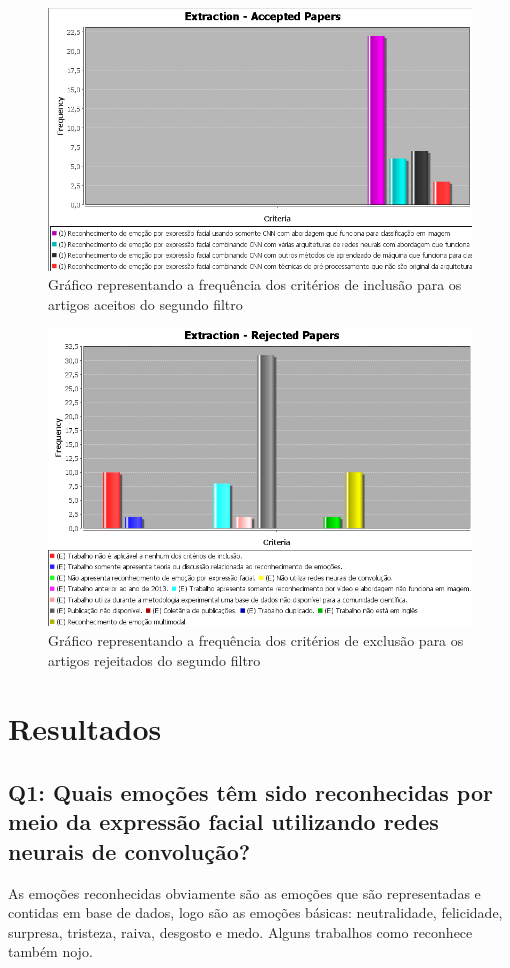 \begin{figure}
\centering
\includegraphics[scale=0.75]{figuras/paperscriteriaaccepted.png}
\caption{Gráfico representando a frequência dos critérios de inclusão para os artigos aceitos do segundo filtro}
\label{fig:papersbyyear}
\end{figure}

\begin{figure}
\centering
\includegraphics[scale=0.75]{figuras/paperscriteriarejected.png}
\caption{Gráfico representando a frequência dos critérios de exclusão para os artigos rejeitados do segundo filtro}
\label{fig:papersbyyear}
\end{figure}

\section{Resultados}\label{sec:results}
\subsection{Q1: Quais emoções têm sido reconhecidas por meio da expressão facial utilizando redes neurais de convolução?}
As emoções reconhecidas obviamente são as emoções que são representadas e contidas em base de dados, logo são as emoções básicas: neutralidade, felicidade, surpresa, tristeza, raiva, desgosto e medo. Alguns trabalhos como \cite{art8} reconhece também nojo.

